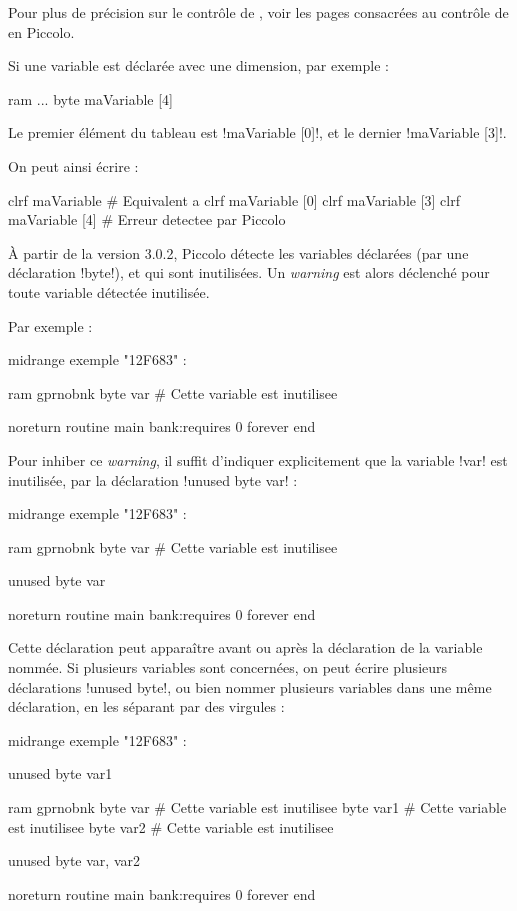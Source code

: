 Pour plus de précision sur le contrôle de , voir les pages consacrées au contrôle de  en Piccolo.

Si une variable est déclarée avec une dimension, par exemple :
\begin{piccolo}
ram ... { 
  byte maVariable [4]
}
\end{piccolo}

Le premier élément du tableau est \pic!maVariable [0]!, et le dernier  \pic!maVariable [3]!.

On peut ainsi écrire :
\begin{piccolo}
  clrf maVariable # Equivalent a clrf maVariable [0]
  clrf maVariable [3]
  clrf maVariable [4] # Erreur detectee par Piccolo
\end{piccolo}












À partir de la version 3.0.2, Piccolo détecte les variables déclarées (par une déclaration \pic!byte!), et qui sont inutilisées. Un \emph{warning} est alors déclenché pour toute variable détectée inutilisée.

Par exemple :

\begin{piccolo}
midrange exemple "12F683" :

ram gprnobnk {
  byte var # Cette variable est inutilisee
}

noreturn routine main bank:requires 0 {
  forever
  end
}
\end{piccolo}


Pour inhiber ce \emph{warning}, il suffit d'indiquer explicitement que la variable \pic!var! est inutilisée, par la déclaration \pic!unused byte var! :

\begin{piccolo}
midrange exemple "12F683" :

ram gprnobnk {
  byte var # Cette variable est inutilisee
}

unused byte var

noreturn routine main bank:requires 0 {
  forever
  end
}
\end{piccolo}

Cette déclaration peut apparaître avant ou après la déclaration de la variable nommée. Si plusieurs variables sont concernées, on peut écrire plusieurs déclarations \pic!unused byte!, ou bien nommer plusieurs variables dans une même déclaration, en les séparant par des virgules :

\begin{piccolo}
midrange exemple "12F683" :

unused byte var1

ram gprnobnk {
  byte var # Cette variable est inutilisee
  byte var1 # Cette variable est inutilisee
  byte var2 # Cette variable est inutilisee
}

unused byte var, var2

noreturn routine main bank:requires 0 {
  forever
  end
}
\end{piccolo}


